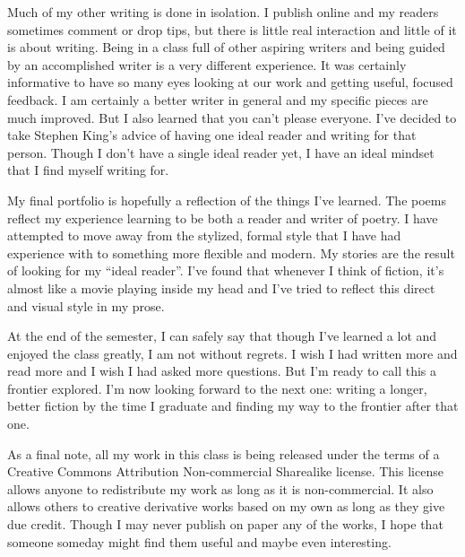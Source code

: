 \documentclass[12pt,letterpaper]{article}
\begin{document}
Much of my other writing is done in isolation. I publish online and my readers sometimes comment or drop tips, but there is little real interaction and little of it is about writing. Being in a class full of other aspiring writers and being guided by an accomplished writer is a very different experience. It was certainly informative to have so many eyes looking at our work and getting useful, focused feedback. I am certainly a better writer in general and my specific pieces are much improved. But I also learned that you can't please everyone. I've decided to take Stephen King's advice of having one ideal reader and writing for that person. Though I don't have a single ideal reader yet, I have an ideal mindset that I find myself writing for.

My final portfolio is hopefully a reflection of the things I've learned. The poems reflect my experience learning to be both a reader and writer of poetry. I have attempted to move away from the stylized, formal style that I have had experience with to something more flexible and modern. My stories are the result of looking for my ``ideal reader''. I've found that whenever I think of fiction, it's almost like a movie playing inside my head and I've tried to reflect this direct and visual style in my prose.

At the end of the semester, I can safely say that though I've learned a lot and enjoyed the class greatly, I am not without regrets. I wish I had written more and read more and I wish I had asked more questions. But I'm ready to call this a frontier explored. I'm now looking forward to the next one: writing a longer, better fiction by the time I graduate and finding my way to the frontier after that one.

As a final note, all my work in this class is being released under the terms of a Creative Commons Attribution Non-commercial Sharealike license. This license allows anyone to redistribute my work as long as it is non-commercial. It also allows others to creative derivative works based on my own as long as they give due credit. Though I may never publish on paper any of the works, I hope that someone someday might find them useful and maybe even interesting.

\end{document}

